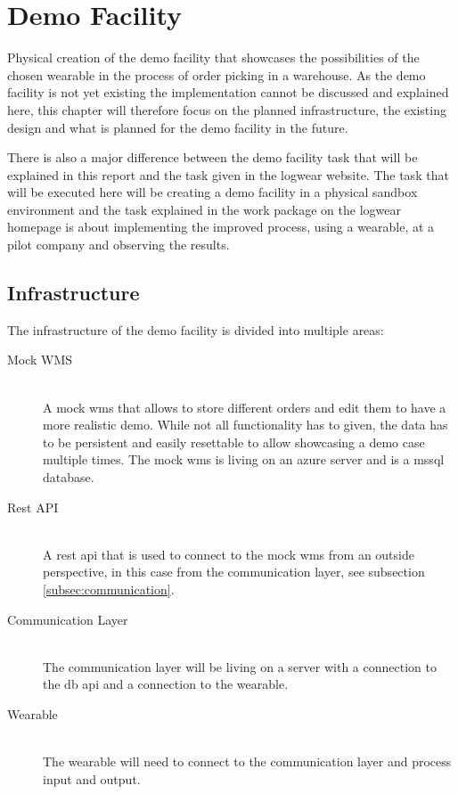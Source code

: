 \chapter{Demo Facility}\label{cha:demoFacility}
Physical creation of the demo facility that showcases the possibilities of the chosen wearable in the process of order picking in a warehouse. As the demo facility is not yet existing the implementation cannot be discussed and explained here, this chapter will therefore focus on the planned infrastructure, the existing design and what is planned for the demo facility in the future. 

There is also a major difference between the demo facility task that will be explained in this report and the task given in the logwear website. \citep{website:logwear} The task that will be executed here will be creating a demo facility in a physical \gls{sandbox} environment and the task explained in the work package on the logwear homepage is about implementing the improved process, using a wearable, at a pilot company and observing the results.

\section{Infrastructure}
The infrastructure of the demo facility is divided into multiple areas:
\begin{description}
	\item[Mock WMS] \hfill \\
		A mock \gls{wms} that allows to store different orders and edit them to have a more realistic demo. While not all functionality has to given, the data has to be persistent and easily resettable to allow showcasing a demo case multiple times. The mock \gls{wms} is living on an azure server and is a \gls{mssql} database.
	\item[Rest API] \hfill \\
		A \gls{rest} \gls{api} that is used to connect to the mock \gls{wms} from an outside perspective, in this case from the communication layer, see subsection \ref{subsec:communication}.
	\item[Communication Layer] \hfill \\
		The communication layer will be living on a server with a connection to the \gls{db} \gls{api} and a connection to the wearable.
	\item[Wearable] \hfill \\
		The wearable will need to connect to the communication layer and process input and output.
\end{description}

